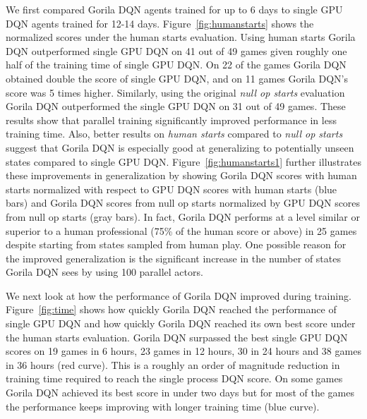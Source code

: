 \documentclass{article}
\begin{document}
We first compared Gorila DQN agents trained for up to 6 days to single GPU DQN agents trained for 12-14 days.
Figure~\ref{fig:humanstarts} shows the normalized scores under the human starts evaluation.
Using human starts Gorila DQN outperformed single GPU DQN on 41 out of 49 games given roughly one half of the training time of single GPU DQN.
On 22 of the games Gorila DQN obtained double the score of single GPU DQN, and on 11 games Gorila DQN's score was 5 times higher.
Similarly, using the original {\it null op starts} evaluation  Gorila DQN outperformed the single GPU DQN on 31 out of 49 games. 
These results show that parallel training significantly improved performance in less training time. Also, better results on {\it human starts} compared to {\it null op starts} suggest that Gorila DQN is especially good at generalizing to potentially unseen states compared to single GPU DQN.  Figure~\ref{fig:humanstarts1} further illustrates these improvements in generalization by showing Gorila DQN scores with human starts normalized with respect to GPU DQN scores with human starts (blue bars) and Gorila DQN scores from null op starts normalized by GPU DQN scores from null op starts (gray bars).
In fact, Gorila DQN performs at a level similar or superior to a human professional (75\% of the human score or above) in 25 games despite starting from states sampled from human play.
One possible reason for the improved generalization is the significant increase in the number of states Gorila DQN sees by using 100 parallel actors.


We next look at how the performance of Gorila DQN improved during training.
Figure~\ref{fig:time} shows how quickly Gorila DQN reached the performance of single GPU DQN and how quickly Gorila DQN reached its own best score under the human starts evaluation.
Gorila DQN surpassed the best single GPU DQN scores on 19 games in 6 hours, 23 games in 12 hours, 30 in 24 hours and 38 games in 36 hours (red curve).
This is a roughly an order of magnitude reduction in training time required to reach the single process DQN score.
On some games Gorila DQN achieved its best score in under two days but for most of the games the performance keeps improving with longer training time (blue curve).
\end{document}
